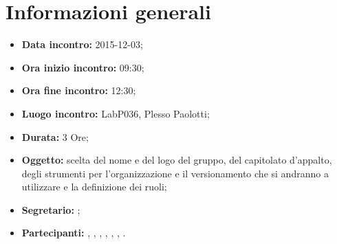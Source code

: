 \newpage
\section{Informazioni generali}
\begin{itemize}
\item \textbf{Data incontro:} 2015-12-03;
\item \textbf{Ora inizio incontro:} 09:30;
\item \textbf{Ora fine incontro:} 12:30;
\item \textbf{Luogo incontro:} LabP036, Plesso Paolotti;
\item \textbf{Durata:} 3 Ore;
\item \textbf{Oggetto:} scelta del nome e del logo del gruppo, del capitolato d'appalto, degli strumenti per l'organizzazione e il versionamento che si andranno a utilizzare e la definizione dei ruoli;
\item \textbf{Segretario:} \AF;
\item \textbf{Partecipanti:} \AF, \FB, \GN, \GR, \MV, \MP, \SM.

\end{itemize}
